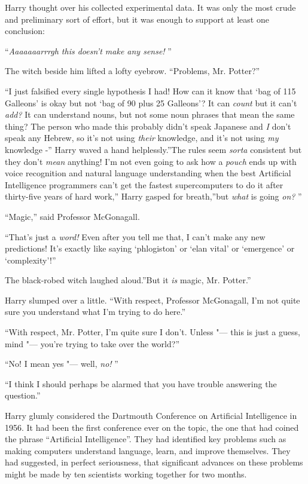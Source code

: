 Harry thought over his collected experimental data. It was only the most
crude and preliminary sort of effort, but it was enough to support at
least one conclusion:

``\emph{Aaaaaaarrrgh this doesn't make any sense!} ''

The witch beside him lifted a lofty eyebrow. ``Problems, Mr. Potter?''

``I just falsified every single hypothesis I had! How can it know that
`bag of 115 Galleons' is okay but not `bag of 90 plus 25 Galleons'? It
can \emph{count} but it can't \emph{add?} It can understand nouns, but
not some noun phrases that mean the same thing? The person who made this
probably didn't speak Japanese and \emph{I} don't speak any Hebrew, so
it's not using \emph{their} knowledge, and it's not using \emph{my}
knowledge -'' Harry waved a hand helplessly.''The rules seem
\emph{sorta} consistent but they don't \emph{mean} anything! I'm not
even going to ask how a \emph{pouch} ends up with voice recognition and
natural language understanding when the best Artificial Intelligence
programmers can't get the fastest supercomputers to do it after
thirty-five years of hard work,'' Harry gasped for breath,''but
\emph{what} is going \emph{on?} ''

``Magic,'' said Professor McGonagall.

``That's just a \emph{word!} Even after you tell me that, I can't make
any new predictions! It's exactly like saying `phlogiston' or `elan
vital' or `emergence' or `complexity'!''

The black-robed witch laughed aloud.''But it \emph{is} magic, Mr.
Potter.''

Harry slumped over a little. ``With respect, Professor McGonagall, I'm
not quite sure you understand what I'm trying to do here.''

``With respect, Mr. Potter, I'm quite sure I don't. Unless "--- this is
just a guess, mind "--- you're trying to take over the world?''

``No! I mean yes "--- well, \emph{no!} ''

``I think I should perhaps be alarmed that you have trouble answering
the question.''

Harry glumly considered the Dartmouth Conference on Artificial
Intelligence in 1956. It had been the first conference ever on the
topic, the one that had coined the phrase ``Artificial Intelligence''.
They had identified key problems such as making computers understand
language, learn, and improve themselves. They had suggested, in perfect
seriousness, that significant advances on these problems might be made
by ten scientists working together for two months.

